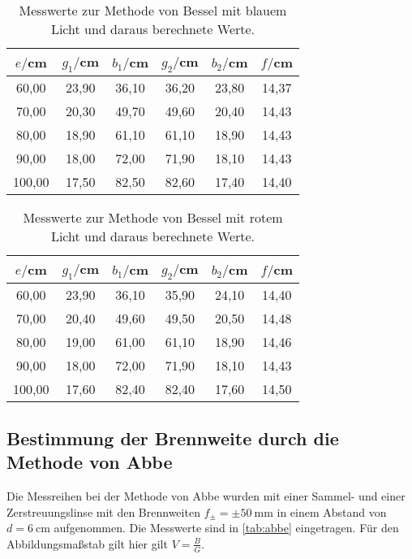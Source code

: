 \begin{table}[htp]
	\begin{center}
    \caption{Messwerte zur Methode von Bessel mit blauem Licht und daraus berechnete Werte.}
    \label{tab:besselblau}
		\begin{tabular}{cccccc}
		\toprule
			{$e/$cm} & {$g_1/$cm} & {$b_1/$cm} & {$g_2/$cm} & {$b_2/$cm} & {$f/$cm}\\
			\midrule
			60,00 & 23,90 & 36,10 & 36,20 & 23,80 & 14,37\\
			70,00 & 20,30 & 49,70 & 49,60 & 20,40 & 14,43\\
			80,00 & 18,90 & 61,10 & 61,10 & 18,90 & 14,43\\
			90,00 & 18,00 & 72,00 & 71,90 & 18,10 & 14,43\\
		  100,00 & 17,50 & 82,50 & 82,60 & 17,40 & 14,40\\
		\bottomrule
		\end{tabular}
	\end{center}
\end{table}

\begin{table}[htp]
	\begin{center}
    \caption{Messwerte zur Methode von Bessel mit rotem Licht und daraus berechnete Werte.}
    \label{tab:besselrot}
		\begin{tabular}{cccccc}
		\toprule
			{$e/$cm} & {$g_1/$cm} & {$b_1/$cm} & {$g_2/$cm} & {$b_2/$cm} & {$f/$cm}\\
			\midrule
			60,00 & 23,90 & 36,10 & 35,90 & 24,10 & 14,40\\
			70,00 & 20,40 & 49,60 & 49,50 & 20,50 & 14,48\\
			80,00 & 19,00 & 61,00 & 61,10 & 18,90 & 14,46\\
			90,00 & 18,00 & 72,00 & 71,90 & 18,10 & 14,43\\
			100,00 & 17,60 & 82,40 & 82,40 & 17,60 & 14,50\\
		\bottomrule
		\end{tabular}
	\end{center}
\end{table}

 \newpage
\subsection{Bestimmung der Brennweite durch die Methode von Abbe}
Die Messreihen bei der Methode von Abbe wurden mit einer Sammel- und einer
Zerstreuungslinse mit den Brennweiten $f_{\pm} = \pm \SI{50}{\mm}$ in
einem Abstand von $d=\SI{6}{\centi\meter}$ aufgenommen.
Die Messwerte sind in \ref{tab:abbe} eingetragen. Für den Abbildungsmaßstab gilt
hier gilt $V=\frac{B}{G}$.

